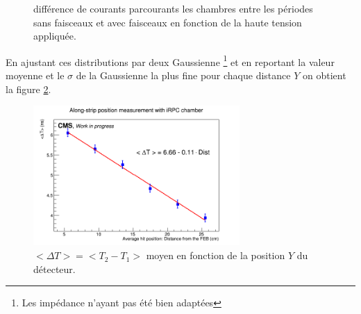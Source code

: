 \begin{figure}[ht!]
	\hfill
	\caption{différence de courants parcourants les chambres entre les périodes sans faisceaux et avec faisceaux en fonction de la haute tension appliquée.}
	\label{move}
\end{figure}

En ajustant ces distributions par deux Gaussienne \footnote{Les impédance n'ayant pas été bien adaptées} et en reportant la valeur moyenne et le $\sigma$ de la Gaussienne la plus fine pour chaque distance $Y$ on obtient la figure \ref{Fit}.

\begin{figure}[!ht]
	\centering
	\includegraphics[width=0.7\textwidth]{ELE/MeanT_Pos.jpg}
	\caption{$<\Delta T>=<T_2-T_1>$ moyen en fonction de la position $Y$ du détecteur.}
	\label{Fit}
\end{figure}

